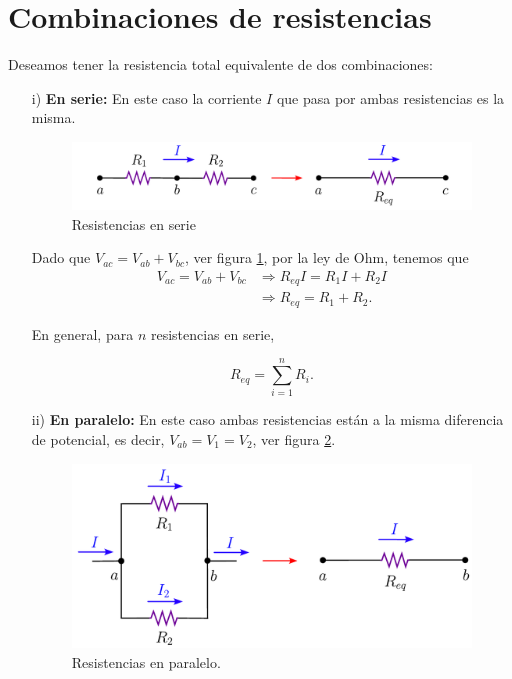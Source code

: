 \section{Combinaciones de resistencias}

Deseamos tener la resistencia total equivalente de dos combinaciones:

\begin{itemize}
\item[i)] \textbf{En serie:} En este caso la corriente $I$ que pasa por ambas resistencias es la misma.

\begin{figure}[H]
    \centering
    \includegraphics[scale = 0.7]{Figuras/Resistencias-Serie.pdf}
    \caption{Resistencias en serie}
    \label{fig:R-Serie}
\end{figure}

Dado que $V_{ac} = V_{ab} + V_{bc}$, ver figura \ref{fig:R-Serie}, por la ley de Ohm, tenemos que
\begin{align*}
  V_{ac} = V_{ab} + V_{bc} &\Rightarrow R_{eq} I = R_1 I + R_2 I \\
&\Rightarrow   R_{eq} = R_1 + R_2.  
\end{align*}


En general, para $n$ resistencias en serie,
\begin{shaded}
 $$R_{eq} = \sum_{i=1}^n R_i. $$  
\end{shaded}

\item[ii)] \textbf{En paralelo:}  En este caso ambas resistencias están a la misma diferencia de potencial, es decir, $V_{ab} = V_1 = V_2$, ver figura \ref{fig:R-Paralelo}. 

\begin{figure}[H]
    \centering
    \includegraphics[scale = 0.7]{Figuras/Resistencias-Paralelo.pdf}
    \caption{Resistencias en paralelo.}
    \label{fig:R-Paralelo}
\end{figure}


\end{itemize}
